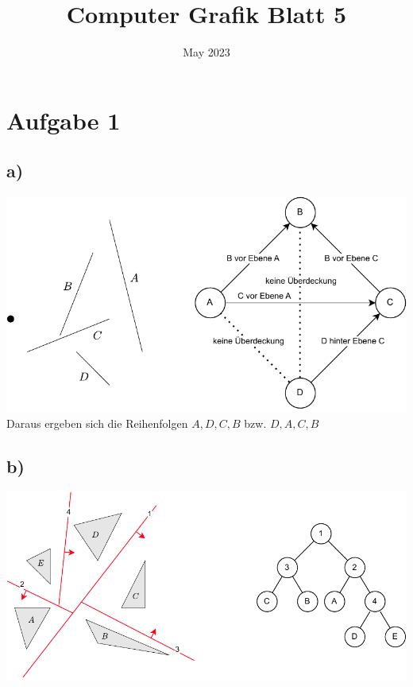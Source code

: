 \documentclass{article}
\title{Computer Grafik Blatt 5}
\date{May 2023}
\begin{document}
\maketitle

\section*{Aufgabe 1}

\subsection*{a)}
\includegraphics[width=\textwidth, keepaspectratio]{aufgabe01a.2.drawio.pdf}
\\
Daraus ergeben sich die Reihenfolgen $A,D,C,B$ bzw. $D,A,C,B$

\subsection*{b)}
\includegraphics[width=\textwidth, keepaspectratio]{aufgabe01b.2.drawio.pdf}
\end{document}
